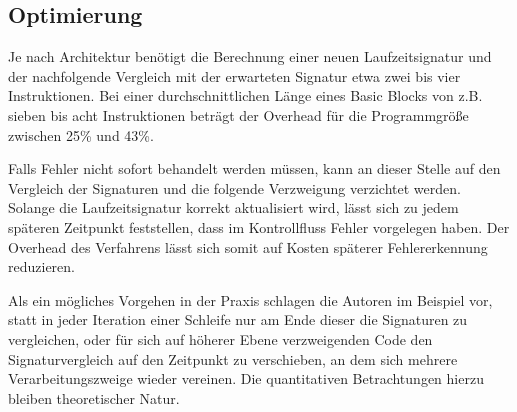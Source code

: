 \documentclass[11pt]{article}
\begin{document}

\subsection{Optimierung}

Je nach Architektur benötigt die Berechnung einer neuen Laufzeitsignatur und
der nachfolgende Vergleich mit der erwarteten Signatur etwa zwei bis vier
Instruktionen. Bei einer durchschnittlichen Länge eines Basic Blocks von z.B.
sieben bis acht Instruktionen beträgt der Overhead für die Programmgröße
zwischen 25\% und 43\%. %

Falls Fehler nicht sofort behandelt werden müssen, kann an dieser Stelle auf
den Vergleich der Signaturen und die folgende Verzweigung verzichtet werden.
Solange die Laufzeitsignatur korrekt aktualisiert wird, lässt sich zu jedem
späteren Zeitpunkt feststellen, dass im Kontrollfluss Fehler vorgelegen haben.
Der Overhead des Verfahrens lässt sich somit auf Kosten späterer
Fehlererkennung reduzieren.

Als ein mögliches Vorgehen in der Praxis schlagen die Autoren im Beispiel vor,
statt in jeder Iteration einer Schleife nur am Ende dieser die Signaturen zu
vergleichen, oder für sich auf höherer Ebene verzweigenden Code den
Signaturvergleich auf den Zeitpunkt zu verschieben, an dem sich mehrere
Verarbeitungszweige wieder vereinen. Die quantitativen Betrachtungen hierzu
bleiben theoretischer Natur.

\pagebreak


\end{document}
